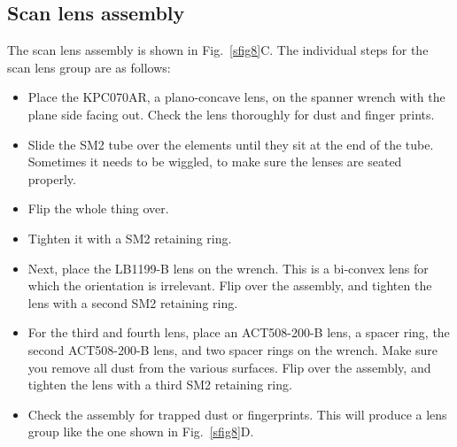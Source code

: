\documentclass[10pt,letterpaper]{article}
\begin{document}
\subsection{Scan lens assembly}
The scan lens assembly is shown in Fig.~\ref{sfig8}C. The individual steps for the scan lens group are as follows:
\begin{itemize}
    \item Place the KPC070AR, a plano-concave lens, on the spanner wrench with the plane side facing out. Check the lens thoroughly for dust and finger prints.
    \item Slide the SM2 tube over the elements until they sit at the end of the tube. Sometimes it needs to be wiggled, to make sure the lenses are seated properly.
    \item Flip the whole thing over.
    \item Tighten it with a SM2 retaining ring.
    \item Next, place the LB1199-B lens on the wrench. This is a bi-convex lens for which the orientation is irrelevant. Flip over the assembly, and tighten the lens with a second SM2 retaining ring. 
    \item For the third and fourth lens, place an ACT508-200-B lens, a spacer ring, the second ACT508-200-B lens, and two spacer rings on the wrench. Make sure you remove all dust from the various surfaces. Flip over the assembly, and tighten the lens with a third SM2 retaining ring. 
    \item Check the assembly for trapped dust or fingerprints. This will produce a lens group like the one shown in Fig.~\ref{sfig8}D.
\end{itemize}
\end{document}

